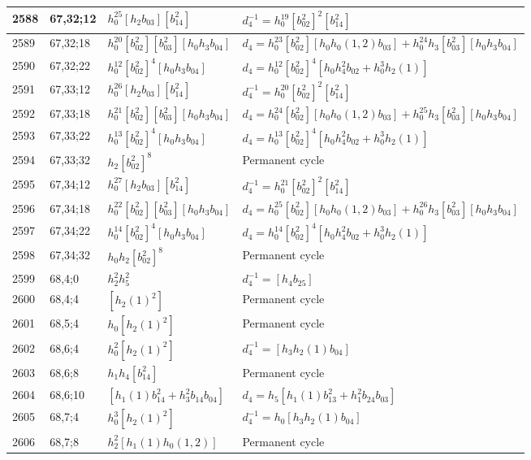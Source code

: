 \documentclass{article}
\begin{document}
\begin{longtable}{|l|l|>{\raggedright\arraybackslash}p{6cm}|>{\raggedright\arraybackslash}p{6cm}|}
\hline
2588 & 67,32;12 & $h_0^{25}[h_2b_{03}][b_{14}^2]$ & $d_{4}^{-1}=h_0^{19}[b_{02}^2]^2[b_{14}^2]$\\
\hline
2589 & 67,32;18 & $h_0^{20}[b_{02}^2][b_{03}^2][h_0h_3b_{04}]$ &$d_{4}=h_0^{23}[b_{02}^2][h_0h_0(1, 2)b_{03}] + h_0^{24}h_3[b_{03}^2][h_0h_3b_{04}]$\\
\hline
2590 & 67,32;22 & $h_0^{12}[b_{02}^2]^4[h_0h_3b_{04}]$ &$d_{4}=h_0^{12}[b_{02}^2]^4[h_0h_4^2b_{02} + h_0^3h_2(1)]$\\
\hline
2591 & 67,33;12 & $h_0^{26}[h_2b_{03}][b_{14}^2]$ & $d_{4}^{-1}=h_0^{20}[b_{02}^2]^2[b_{14}^2]$\\
\hline
2592 & 67,33;18 & $h_0^{21}[b_{02}^2][b_{03}^2][h_0h_3b_{04}]$ &$d_{4}=h_0^{24}[b_{02}^2][h_0h_0(1, 2)b_{03}] + h_0^{25}h_3[b_{03}^2][h_0h_3b_{04}]$\\
\hline
2593 & 67,33;22 & $h_0^{13}[b_{02}^2]^4[h_0h_3b_{04}]$ &$d_{4}=h_0^{13}[b_{02}^2]^4[h_0h_4^2b_{02} + h_0^3h_2(1)]$\\
\hline
2594 & 67,33;32 & $h_2[b_{02}^2]^8$ & Permanent cycle\\
\hline
2595 & 67,34;12 & $h_0^{27}[h_2b_{03}][b_{14}^2]$ & $d_{4}^{-1}=h_0^{21}[b_{02}^2]^2[b_{14}^2]$\\
\hline
2596 & 67,34;18 & $h_0^{22}[b_{02}^2][b_{03}^2][h_0h_3b_{04}]$ &$d_{4}=h_0^{25}[b_{02}^2][h_0h_0(1, 2)b_{03}] + h_0^{26}h_3[b_{03}^2][h_0h_3b_{04}]$\\
\hline
2597 & 67,34;22 & $h_0^{14}[b_{02}^2]^4[h_0h_3b_{04}]$ &$d_{4}=h_0^{14}[b_{02}^2]^4[h_0h_4^2b_{02} + h_0^3h_2(1)]$\\
\hline
2598 & 67,34;32 & $h_0h_2[b_{02}^2]^8$ & Permanent cycle\\
\hline
2599 & 68,4;0 & $h_2^2h_5^2$ & $d_{4}^{-1}=[h_4b_{25}]$\\
\hline
2600 & 68,4;4 & $[h_2(1)^2]$ & Permanent cycle\\
\hline
2601 & 68,5;4 & $h_0[h_2(1)^2]$ & Permanent cycle\\
\hline
2602 & 68,6;4 & $h_0^2[h_2(1)^2]$ & $d_{4}^{-1}=[h_3h_2(1)b_{04}]$\\
\hline
2603 & 68,6;8 & $h_1h_4[b_{14}^2]$ & Permanent cycle\\
\hline
2604 & 68,6;10 & $[h_1(1)b_{14}^2 + h_3^2b_{14}b_{04}]$ &$d_{4}=h_5[h_1(1)b_{13}^2 + h_1^2b_{24}b_{03}]$\\
\hline
2605 & 68,7;4 & $h_0^3[h_2(1)^2]$ & $d_{4}^{-1}=h_0[h_3h_2(1)b_{04}]$\\
\hline
2606 & 68,7;8 & $h_2^2[h_1(1)h_0(1, 2)]$ & Permanent cycle\\

\end{longtable}
\end{document}

